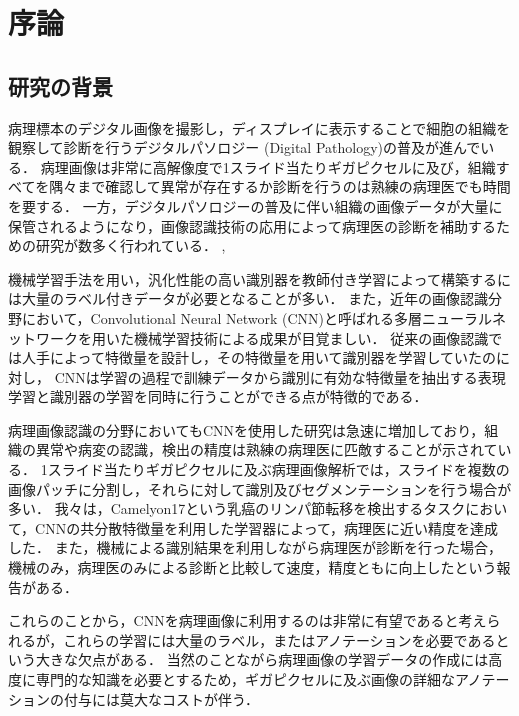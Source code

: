 \chapter{序論}

\section{研究の背景}

病理標本のデジタル画像を撮影し，ディスプレイに表示することで細胞の組織を観察して診断を行うデジタルパソロジー (Digital Pathology)の普及が進んでいる．
病理画像は非常に高解像度で1スライド当たりギガピクセルに及び，組織すべてを隅々まで確認して異常が存在するか診断を行うのは熟練の病理医でも時間を要する．
一方，デジタルパソロジーの普及に伴い組織の画像データが大量に保管されるようになり，画像認識技術の応用によって病理医の診断を補助するための研究が数多く行われている．
\cite{doyle2008automated}, \cite{dundar2011computerized}



機械学習手法を用い，汎化性能の高い識別器を教師付き学習によって構築するには大量のラベル付きデータが必要となることが多い．
また，近年の画像認識分野において，Convolutional Neural Network (CNN)と呼ばれる多層ニューラルネットワークを用いた機械学習技術による成果が目覚ましい．
従来の画像認識では人手によって特徴量を設計し，その特徴量を用いて識別器を学習していたのに対し，
CNNは学習の過程で訓練データから識別に有効な特徴量を抽出する表現学習と識別器の学習を同時に行うことができる点が特徴的である．

病理画像認識の分野においてもCNNを使用した研究は急速に増加しており，組織の異常や病変の認識，検出の精度は熟練の病理医に匹敵することが示されている．
1スライド当たりギガピクセルに及ぶ病理画像解析では，スライドを複数の画像パッチに分割し，それらに対して識別及びセグメンテーションを行う場合が多い．
我々は，Camelyon17という乳癌のリンパ節転移を検出するタスクにおいて，CNNの共分散特徴量を利用した学習器によって，病理医に近い精度を達成した．
また，機械による識別結果を利用しながら病理医が診断を行った場合，機械のみ，病理医のみによる診断と比較して速度，精度ともに向上したという報告がある．

これらのことから，CNNを病理画像に利用するのは非常に有望であると考えられるが，これらの学習には大量のラベル，またはアノテーションを必要であるという大きな欠点がある．
当然のことながら病理画像の学習データの作成には高度に専門的な知識を必要とするため，ギガピクセルに及ぶ画像の詳細なアノテーションの付与には莫大なコストが伴う．


